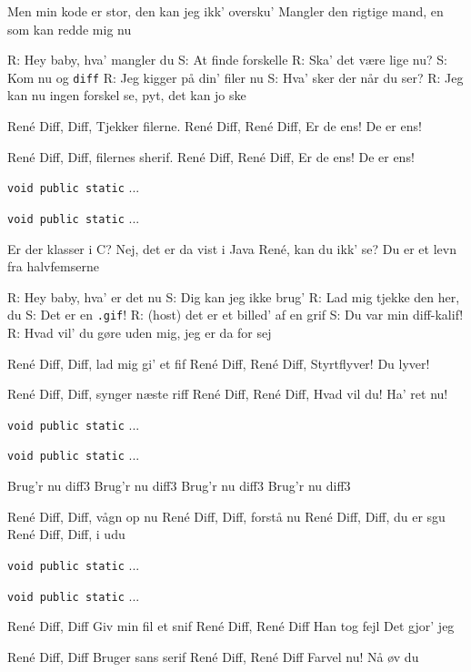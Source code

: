 \documentclass[pdftex,12pt]{article}
\begin{document}
\begin{songs}{}
\endverse
\beginverse
Men min kode er stor,
den kan jeg ikk' oversku'
Mangler den rigtige mand,
en som kan redde mig nu

\endverse
\beginverse
R: Hey baby, hva' mangler du
S: At finde forskelle
R: Ska' det være lige nu?
S: Kom nu og \texttt{diff}
R: Jeg kigger på din' filer nu
S: Hva' sker der når du ser?
R: Jeg kan nu ingen forskel se, pyt, det kan jo ske

\endverse
\beginverse
René Diff, Diff,
Tjekker filerne.
René Diff, René Diff,
Er de ens!
De er ens!

\endverse
\beginverse
René Diff, Diff,
filernes sherif.
René Diff, René Diff,
Er de ens!
De er ens!

\endverse
\beginverse
\texttt{void public static} ...

\endverse
\beginverse
\texttt{void public static} ...

\endverse
\beginverse
Er der klasser i C?
Nej, det er da vist i Java
René, kan du ikk' se?
Du er et levn fra halvfemserne

\endverse
\beginverse
R: Hey baby, hva' er det nu
S: Dig kan jeg ikke brug'
R: Lad mig tjekke den her, du
S: Det er en \texttt{.gif}!
R: (host) det er et billed' af en grif
S: Du var min diff-kalif!
R: Hvad vil' du gøre uden mig, jeg er da for sej

\endverse
\beginverse
René Diff, Diff,
lad mig gi' et fif
René Diff, René Diff,
Styrtflyver!
Du lyver!

\endverse
\beginverse
René Diff, Diff,
synger næste riff
René Diff, René Diff,
Hvad vil du!
Ha' ret nu!

\endverse
\beginverse
\texttt{void public static} ...

\endverse
\beginverse
\texttt{void public static} ...

\endverse
\beginverse
Brug'r nu diff3
Brug'r nu diff3
Brug'r nu diff3
Brug'r nu diff3

\endverse
\beginverse
René Diff, Diff,
vågn op nu
René Diff, Diff,
forstå nu
René Diff, Diff,
du er sgu
René Diff, Diff,
i udu

\endverse
\beginverse
\texttt{void public static} ...

\endverse
\beginverse
\texttt{void public static} ...

\endverse
\beginverse
René Diff, Diff
Giv min fil et snif
René Diff, René Diff
Han tog fejl
Det gjor' jeg

\endverse
\beginverse
René Diff, Diff
Bruger sans serif
René Diff, René Diff
Farvel nu!
Nå øv du


\end{songs}
\end{document}
